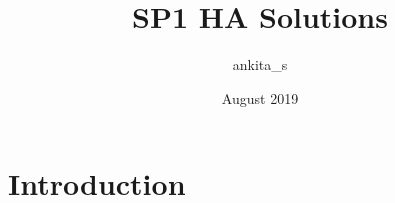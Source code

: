 \documentclass{article}
\title{SP1 HA Solutions}
\author{ankita_s }
\date{August 2019}
\begin{document}
\maketitle

\section{Introduction}
\end{document}
